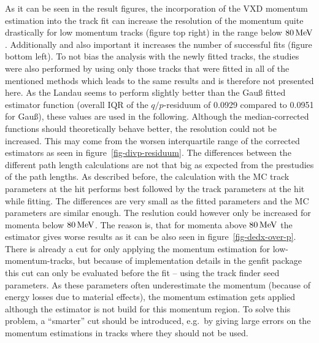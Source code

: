 As it can be seen in the result figures, the incorporation of the VXD momentum estimation into the track fit can increase the resolution of the momentum quite drastically for low momentum tracks (figure top right) in the range below $\unit[80]{MeV}$. Additionally and also important it increases the number of successful fits (figure bottom left). To not bias the analysis with the newly fitted tracks, the studies were also performed by using only those tracks that were fitted in all of the mentioned methods which leads to the same results and is therefore not presented here. As the Landau seems to perform slightly better than the Gauß fitted estimator function (overall IQR of the $q/p$-residuum of 0.0929 compared to 0.0951 for Gauß), these values are used in the following. Although the median-corrected functions should theoretically behave better, the resolution could not be increased. This may come from the worsen interquartile range of the corrected estimators as seen in figure~\ref{fig-divp-residuum}. The differences between the different path length calculations are not that big as expected from the prestudies of the path lengths. As described before, the calculation with the MC track parameters at the hit performs best followed by the track parameters at the hit while fitting. The differences are very small as the fitted parameters and the MC parameters are similar enough. The reslution could however only be increased for momenta below $\unit[80]{MeV}$. The reason is, that for momenta above $\unit[80]{MeV}$ the estimator gives worse results as it can be also seen in figure~\ref{fig-dedx-over-p}. There is already a cut for only applying the momentum estimation for low-momentum-tracks, but because of implementation details in the genfit package this cut can only be evaluated before the fit -- using the track finder seed parameters. As these parameters often underestimate the momentum (because of energy losses due to material effects), the momentum estimation gets applied although the estimator is not build for this momentum region. To solve this problem, a ``smarter'' cut should be introduced, e.g.\ by giving large errors on the momentum estimations in tracks where they should not be used.

